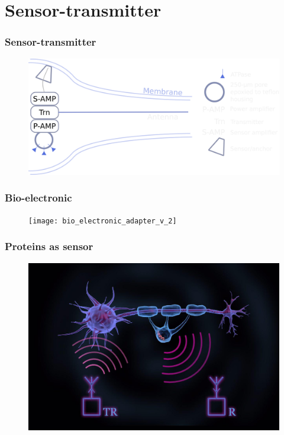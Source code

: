 \documentclass[12pt]{beamer}
\begin{document}
\section{Sensor-transmitter}

\begin{frame}
\frametitle{Sensor-transmitter}
\begin{figure}
\includegraphics[width=1.0\linewidth]{cellCircuit_transmitter}
\end{figure}
\end{frame}


\begin{frame}
\frametitle{Bio-electronic}
\begin{figure}
\texttt{[image: bio\_electronic\_adapter\_v\_2]}
\end{figure}
\end{frame}


\begin{frame}
\frametitle{Proteins as sensor}
\begin{figure}
\includegraphics[width=0.9\linewidth]{ferritin_protein_dia}
\end{figure}
\end{frame}
\end{document}
